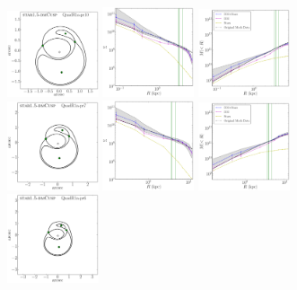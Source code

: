 \documentclass[galley,usenatbib]{mn2e}
\begin{document}
\begin{figure}
\includegraphics[width=0.24\textwidth]{BCQuadR1a-pr10_TmS-a.pdf}
\includegraphics[width=0.24\textwidth]{BCQuadR1a-pr10_TmS-b.pdf}
\includegraphics[width=0.24\textwidth]{BCQuadR1a-pr10_TmS-c.pdf} \\
\includegraphics[width=0.24\textwidth]{BCQuadR1a-pr7_TmS-a.pdf}
\includegraphics[width=0.24\textwidth]{BCQuadR1a-pr7_TmS-b.pdf}
\includegraphics[width=0.24\textwidth]{BCQuadR1a-pr7_TmS-c.pdf} \\
\includegraphics[width=0.24\textwidth]{BCQuadR1a-pr6_TmS-a.pdf}

\end{figure}
\end{document}

